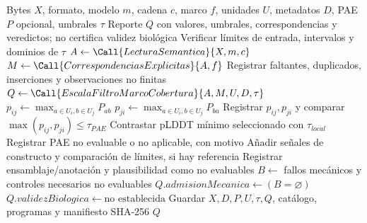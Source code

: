 \begin{algorithm}
\caption{Inspección estructural con evidencia insuficiente explícita}
\label{alg:trp-structural}
\begin{algorithmic}[1]
\Require Bytes $X$, formato, modelo $m$, cadena $c$, marco $f$, unidades $U$, metadatos $D$, PAE $P$ opcional, umbrales $\tau$
\Ensure Reporte $Q$ con valores, umbrales, correspondencias y veredictos; no certifica validez biológica
\State Verificar límites de entrada, intervalos y dominios de $\tau$
\State $A \gets \Call{LecturaSemantica}{X,m,c}$ 
\State $M \gets \Call{CorrespondenciasExplicitas}{A,f}$
\State Registrar faltantes, duplicados, inserciones y observaciones no finitas
\State $Q \gets \Call{EscalaFiltroMarcoCobertura}{A,M,U,D,\tau}$
    \State $p_{ij}\gets\max_{a\in U_i,b\in U_j} P_{ab}$
    \State $p_{ji}\gets\max_{a\in U_i,b\in U_j} P_{ba}$
    \State Registrar $p_{ij},p_{ji}$ y comparar $\max(p_{ij},p_{ji})\leq\tau_{PAE}$
  \EndFor
  \State Contrastar pLDDT mínimo seleccionado con $\tau_{local}$
\Else
  \State Registrar PAE no evaluable o no aplicable, con motivo
\EndIf
\State Añadir señales de constructo y comparación de límites, si hay referencia
\State Registrar ensamblaje/anotación y plausibilidad como no evaluables
\State $B\gets$ fallos mecánicos y controles necesarios no evaluables
\State $Q.admisionMecanica\gets(B=\varnothing)$
\State $Q.validezBiologica\gets\text{no establecida}$
\State Guardar $X,D,P,U,\tau,Q$, catálogo, programas y manifiesto SHA-256
\State \Return $Q$
\end{algorithmic}
\end{algorithm}
